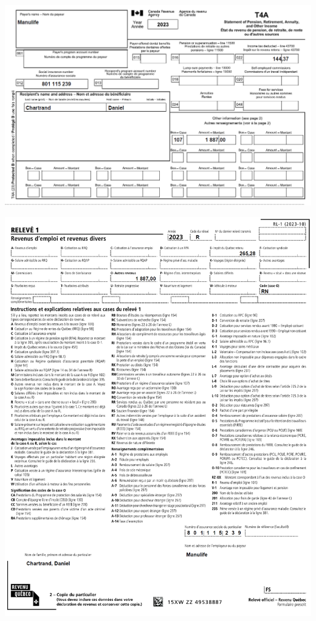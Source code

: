 \noindent
\includegraphics[width=\textwidth]{probleme/chapitre-2/T4A-Manulife.png}

\noindent
\includegraphics[width=\textwidth]{probleme/chapitre-2/RL1-Manulife.png}

